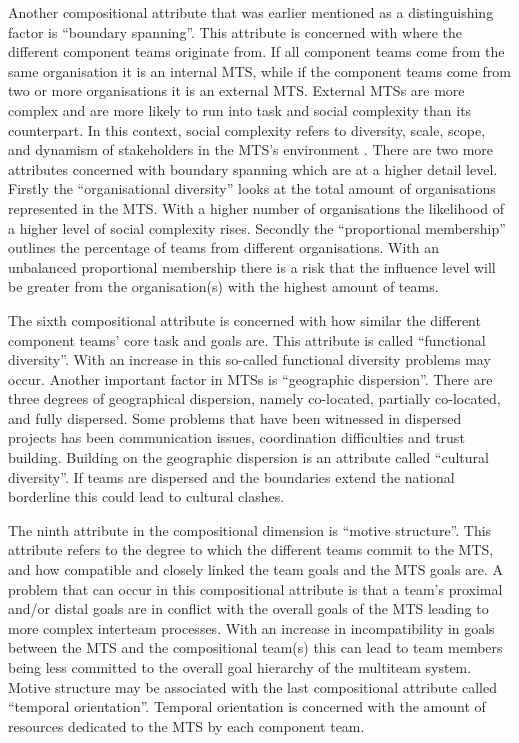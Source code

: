 
Another compositional attribute that was earlier mentioned as a distinguishing factor is ``boundary spanning''. This attribute is concerned with where the different component teams originate from. If all component teams come from the same organisation it is an internal MTS, while if the component teams come from two or more organisations it is an external MTS. External MTSs are more complex and are more likely to run into task and social complexity than its counterpart. In this context, social complexity refers to diversity, scale, scope, and dynamism of stakeholders in the MTS's environment \cite{?}. There are two more attributes concerned with boundary spanning which are at a higher detail level. Firstly the ``organisational diversity'' looks at the total amount of organisations represented in the MTS. With a higher number of organisations the likelihood of a higher level of social complexity rises. Secondly the ``proportional membership'' outlines the percentage of teams from different organisations. With an unbalanced proportional membership there is a risk that the influence level will be greater from the organisation(s) with the highest amount of teams.

The sixth compositional attribute is concerned with how similar the different component teams' core task and goals are. This attribute is called ``functional diversity''. With an increase in this so-called functional diversity problems may occur. Another important factor in MTSs is ``geographic dispersion''. There are three degrees of geographical dispersion, namely co-located, partially co-located, and fully dispersed. Some problems that have been witnessed in dispersed projects has been communication issues, coordination difficulties and trust building. Building on the geographic dispersion is an attribute called ``cultural diversity''. If teams are dispersed and the boundaries extend the national borderline this could lead to cultural clashes.

The ninth attribute in the compositional dimension is ``motive structure''. This attribute refers to the degree to which the different teams commit to the MTS, and how compatible and closely linked the team goals and the MTS goals are. A problem that can occur in this compositional attribute is that a team's proximal and/or distal goals are in conflict with the overall goals of the MTS leading to more complex interteam processes. With an increase in incompatibility in goals between the MTS and the compositional team(s) this can lead to team members being less committed to the overall goal hierarchy of the multiteam system. Motive structure may be associated with the last compositional attribute called ``temporal orientation''. Temporal orientation is concerned with the amount of resources dedicated to the MTS by each component team.

